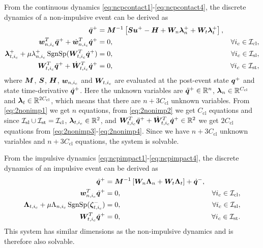 \documentclass[../DC2017114Bouma.tex]{subfiles}
\begin{document}
From the continuous dynamics \eqref{eq:ncpcontact1}-\eqref{eq:ncpcontact4}, the discrete dynamics of a non-impulsive event can be derived as
\begin{align}
\ddot{{\boldsymbol{q}}}^+ &= {\boldsymbol{M}}^{-1}\left[{\boldsymbol{S}}{\boldsymbol{u}}^+ - {\boldsymbol{H}} + {\boldsymbol{W}}_{n}\boldsymbol{\lambda}^+_{n} + {\boldsymbol{W}}_{t}\boldsymbol{\lambda}^+_{t}\right], &  \label{eq:2nonimp1}\\
{\boldsymbol{w}}^T_{n,i_c}\ddot{{\boldsymbol{q}}}^+ + \dot{{\boldsymbol{w}}}^T_{n,i_c}\dot{{\boldsymbol{q}}}^+ &= 0, & \forall i_c\in\mathcal{I}_{\text{cl}},\label{eq:2nonimp2}\\
\boldsymbol{\lambda}^+_{t,i_c} + \mu\lambda^+_{n,i_c}\operatorname{\text{SgnSp}}({\boldsymbol{W}}_{t,i_c}^T\dot{{\boldsymbol{q}}}^+) &= 0, & \forall i_c\in\mathcal{I}_{\text{sl}},\label{eq:2nonimp3}\\
{\boldsymbol{W}}^T_{t,i_c}\ddot{{\boldsymbol{q}}}^+ + \dot{{\boldsymbol{W}}}^T_{t,i_c}\dot{{\boldsymbol{q}}}^+ &= 0, & \forall i_c\in\mathcal{I}_{\text{st}},\label{eq:2nonimp4}
\end{align}
where ${\boldsymbol{M}}$, ${\boldsymbol{S}}$, ${\boldsymbol{H}}$, ${\boldsymbol{w}}_{n,i_c}$ and ${\boldsymbol{W}}_{t,i_c}$ are evaluated at the post-event state ${\boldsymbol{q}}^+$ and state time-derivative $\dot{{\boldsymbol{q}}}^+$. Here the unknown variables are $\ddot{{\boldsymbol{q}}}^+\in\mathbb{R}^{n}$, $\boldsymbol{\lambda}_{n}\in\mathbb{R}^{C_{\text{cl}}}$ and $\boldsymbol{\lambda}_{t}\in\mathbb{R}^{2C_{\text{cl}}}$, which means that there are $n+3C_{\text{cl}}$ unknown variables. From \eqref{eq:2nonimp1} we get $n$ equations, from \eqref{eq:2nonimp2} we get $C_{\text{cl}}$ equations and since $\mathcal{I}_{\text{sl}}\cup\mathcal{I}_{\text{st}}=\mathcal{I}_{\text{cl}}$, $\boldsymbol{\lambda}_{t,i_c}\in\mathbb{R}^2$, and ${\boldsymbol{W}}^T_{t,i_c}\ddot{{\boldsymbol{q}}}^+ + \dot{{\boldsymbol{W}}}^T_{t,i_c}\dot{{\boldsymbol{q}}}^+ \in\mathbb{R}^2$ we get $2C_{\text{cl}}$ equations from \eqref{eq:2nonimp3}-\eqref{eq:2nonimp4}. Since we have $n+3C_{\text{cl}}$ unknown variables and $n+3C_{\text{cl}}$ equations, the system is solvable.  

From the impulsive dynamics \eqref{eq:ncpimpact1}-\eqref{eq:ncpimpact4}, the discrete dynamics of an impulsive event can be derived as
\begin{align}
\dot{{\boldsymbol{q}}}^+ &= {\boldsymbol{M}}^{-1}\left[{\boldsymbol{W}}_{n}\boldsymbol{\Lambda}_{n} + {\boldsymbol{W}}_{t}\boldsymbol{\Lambda}_{t}\right] + \dot{{\boldsymbol{q}}}^-, \label{eq:2imp1}\\
{\boldsymbol{w}}^T_{n,i_c}\dot{{\boldsymbol{q}}}^+ &= 0, &\forall i_c\in\mathcal{I}_{\text{cl}},\label{eq:2imp2}\\
\boldsymbol{\Lambda}_{t,i_c} + \mu\Lambda_{n,i_c}\operatorname{\text{SgnSp}}(\boldsymbol{\zeta}^-_{t,i_c})&= 0, &\forall i_c\in\mathcal{I}_{\text{sl}},\label{eq:2imp3}\\
{\boldsymbol{W}}^T_{t,i_c}\dot{{\boldsymbol{q}}}^+ &= 0, &\forall i_c\in\mathcal{I}_{\text{st}}.\label{eq:2imp4}
\end{align}
This system has similar dimensions as the non-impulsive dynamics and is therefore also solvable.
\end{document}
